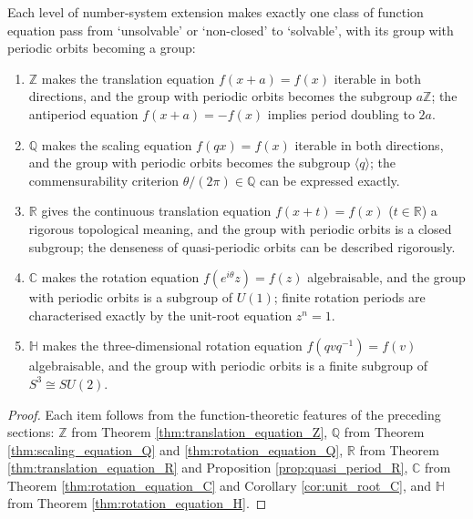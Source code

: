 \begin{theorem}\label{thm:number_system_function_equation}
Each level of number-system extension makes exactly one class of function equation pass from `unsolvable' or `non-closed' to `solvable', with its group with periodic orbits becoming a group:
\begin{enumerate}[label=(\roman*)]
    \item $\mathbb{Z}$ makes the translation equation $f(x+a)=f(x)$ iterable in both directions, and the group with periodic orbits becomes the subgroup $a\mathbb{Z}$; the antiperiod equation $f(x+a)=-f(x)$ implies period doubling to $2a$.
    \item $\mathbb{Q}$ makes the scaling equation $f(qx)=f(x)$ iterable in both directions, and the group with periodic orbits becomes the subgroup $\langle q\rangle$; the commensurability criterion $\theta/(2\pi)\in\mathbb{Q}$ can be expressed exactly.
    \item $\mathbb{R}$ gives the continuous translation equation $f(x+t)=f(x)$ ($t\in\mathbb{R}$) a rigorous topological meaning, and the group with periodic orbits is a closed subgroup; the denseness of quasi-periodic orbits can be described rigorously.
    \item $\mathbb{C}$ makes the rotation equation $f(e^{i\theta}z)=f(z)$ algebraisable, and the group with periodic orbits is a subgroup of $U(1)$; finite rotation periods are characterised exactly by the unit-root equation $z^n=1$.
    \item $\mathbb{H}$ makes the three-dimensional rotation equation $f(qvq^{-1})=f(v)$ algebraisable, and the group with periodic orbits is a finite subgroup of $S^3\cong SU(2)$.
\end{enumerate}
\end{theorem}

\begin{proof}
Each item follows from the function-theoretic features of the preceding sections: $\mathbb{Z}$ from Theorem \ref{thm:translation_equation_Z}, $\mathbb{Q}$ from Theorem \ref{thm:scaling_equation_Q} and \ref{thm:rotation_equation_Q}, $\mathbb{R}$ from Theorem \ref{thm:translation_equation_R} and Proposition \ref{prop:quasi_period_R}, $\mathbb{C}$ from Theorem \ref{thm:rotation_equation_C} and Corollary \ref{cor:unit_root_C}, and $\mathbb{H}$ from Theorem \ref{thm:rotation_equation_H}.
\end{proof}

